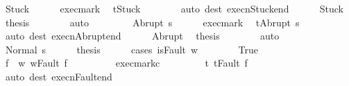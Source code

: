 \begin{isabellebody}
\ Stuck\isanewline
\ \ \ \ \isamarkupfalse%
\ exec{\isacharunderscore}mark\ \isamarkupfalse%
\ {\isachardoublequoteopen}t{\isacharequal}Stuck{\isachardoublequoteclose}\isanewline
\ \ \ \ \ \ \isamarkupfalse%
\ {\isacharparenleft}auto\ dest{\isacharcolon}\ execn{\isacharunderscore}Stuck{\isacharunderscore}end{\isacharparenright}\isanewline
\ \ \ \ \isamarkupfalse%
\ Stuck\ \isamarkupfalse%
\ {\isacharquery}thesis\isanewline
\ \ \ \ \ \ \isamarkupfalse%
\ auto\isanewline
\ \ \isamarkupfalse%
\isanewline
\ \ \ \ \isamarkupfalse%
\ {\isacharparenleft}Abrupt\ s{\isacharprime}{\isacharparenright}\isanewline
\ \ \ \ \isamarkupfalse%
\ exec{\isacharunderscore}mark\ \isamarkupfalse%
\ {\isachardoublequoteopen}t{\isacharequal}Abrupt\ s{\isacharprime}{\isachardoublequoteclose}\isanewline
\ \ \ \ \ \ \isamarkupfalse%
\ {\isacharparenleft}auto\ dest{\isacharcolon}\ execn{\isacharunderscore}Abrupt{\isacharunderscore}end{\isacharparenright}\isanewline
\ \ \ \ \isamarkupfalse%
\ Abrupt\ \isamarkupfalse%
\ {\isacharquery}thesis\isanewline
\ \ \ \ \ \ \isamarkupfalse%
\ auto\isanewline
\ \ \isamarkupfalse%
\isanewline
\ \ \ \ \isamarkupfalse%
\ {\isacharparenleft}Normal\ s{\isacharprime}{\isacharparenright}\isanewline
\ \ \ \ \isamarkupfalse%
\ {\isacharquery}thesis\isanewline
\ \ \ \ \isamarkupfalse%
\ {\isacharparenleft}cases\ {\isachardoublequoteopen}isFault\ w{\isachardoublequoteclose}{\isacharparenright}\isanewline
\ \ \ \ \ \ \isamarkupfalse%
\ True\isanewline
\ \ \ \ \ \ \isamarkupfalse%
\ \isamarkupfalse%
\ f\ \ w{\isacharprime}{\isacharcolon}\ {\isachardoublequoteopen}w{\isacharequal}Fault\ f{\isachardoublequoteclose}\isacommand{{\isachardot}{\isachardot}}\isamarkupfalse%
\isanewline
\ \ \ \ \ \ \isamarkupfalse%
\ \isamarkupfalse%
\ exec{\isacharunderscore}mark{\isacharunderscore}c{}\ \isanewline
\ \ \ \ \ \ \isamarkupfalse%
\ t{\isacharcolon}\ {\isachardoublequoteopen}t{\isacharequal}Fault\ f{\isachardoublequoteclose}\isanewline
\ \ \ \ \ \ \ \ \isamarkupfalse%
\ {\isacharparenleft}auto\ dest{\isacharcolon}\ execn{\isacharunderscore}Fault{\isacharunderscore}end{\isacharparenright}\isanewline
\ \ \ \ \ \ \isamarkupfalse%

\end{isabellebody}
